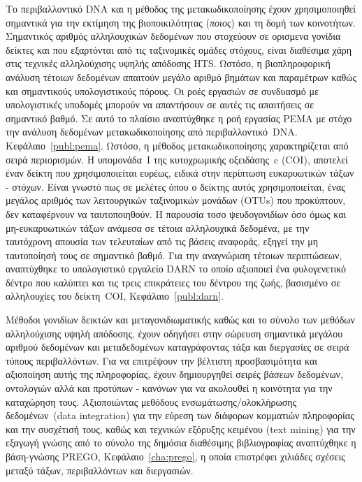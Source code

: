 \documentclass[master=elt, cleveref, autoref, masteroption=eg]{kulemt}
\begin{document}
\begin{abstract*}
   Το περιβαλλοντικό  \foreignlanguage{english}{DNA}  και η μέθοδος της μετακωδικοποίησης έχουν χρησιμοποιηθεί σημαντικά για την εκτίμηση της βιοποικιλότητας
   (\textit{ποιος}) και τη δομή των κοινοτήτων. 
   Σημαντικός αριθμός αλληλουχικών δεδομένων που στοχεύουν σε ορισμενα γονίδια δείκτες και που εξαρτόνται από τις ταξινομικές ομάδες στόχους, 
   είναι διαθέσιμα χάρη στις τεχνικές αλληλούχισης υψηλής απόδοσης \foreignlanguage{english}{HTS}. 
   Ωστόσο, η βιοπληροφορική ανάλυση τέτοιων δεδομένων απαιτούν μεγάλο αριθμό βημάτων και παραμέτρων καθώς και σημαντικούς υπολογιστικούς πόρους. 
   Οι ροές εργασιών σε συνδυασμό με υπολογιστικές υποδομές μπορούν να απαντήσουν σε αυτές τις απαιτήσεις σε σημαντικό βαθμό. 
   Σε αυτό το πλαίσιο αναπτύχθηκε η ροή εργασίας \foreignlanguage{english}{PEMA} με στόχο την ανάλυση δεδομένων μετακωδικοποίησης από περιβαλλοντικό~\foreignlanguage{english}{DNA}.
   Κεφάλαιο~\foreignlanguage{english}{\ref{publ:pema}}.
   Ωστόσο, η μέθοδος μετακωδικοποίησης χαρακτηρίζεται από σειρά περιορισμών. 
   Η υπομονάδα~\foreignlanguage{english}{I} της κυτοχρωμικής οξειδάσης~\foreignlanguage{english}{c (COI)}, αποτελεί έναν δείκτη 
   που χρησιμοποιείται ευρέως, ειδικά στην περίπτωση ευκαρυωτικών τάξων - στόχων. 
   Είναι γνωστό πως σε μελέτες όπου ο δείκτης αυτός χρησιμοποιείται, ένας μεγάλος αριθμός των λειτουργικών 
   ταξινομικών μονάδων \foreignlanguage{english}{(OTUs)} που προκύπτουν, δεν καταφέρνουν να ταυτοποιηθούν. 
   Η παρουσία τοσο ψευδογονιδίων όσο όμως και μη-ευκαρυωτικών τάξων ανάμεσα σε τέτοια αλληλουχικά δεδομένα,
   με την ταυτόχρονη απουσία των τελευταίων από τις βάσεις αναφοράς, εξηγεί την μη ταυτοποίησή τους σε σημαντικό βαθμό. 
   Για την αναγνώριση τέτοιων περιπτώσεων, αναπτύχθηκε το υπολογιστικό εργαλείο \foreignlanguage{english}{DARN} το οποίο 
   αξιοποιεί ένα φυλογενετικό δέντρο που καλύπτει και τις τρεις επικράτειες του δέντρου της ζωής, βασισμένο σε αλληλουχίες του 
   δείκτη~\foreignlanguage{english}{COI}, Κεφάλαιο~\foreignlanguage{english}{\ref{publ:darn}}.

   Μέθοδοι γονιδίων δεικτών και μεταγονιδιωματικής καθώς και το σύνολο των μεθόδων αλληλούχισης υψηλή απόδοσης, 
   έχουν οδηγήσει στην σώρευση σημαντικά μεγάλου αριθμού δεδομένων και μεταδεδομένων 
   καταγράφοντας τάξα και διεργασίες σε σειρά τύπους περιβαλλόντων.
   Για να επιτρέψουν την βέλτιστη προσβασιμότητα και αξιοποίηση αυτής της πληροφορίας,
   έχουν δημιουργηθεί
   σειρές βάσεων δεδομένων, οντολογιών αλλά και προτύπων - κανόνων για να ακολουθεί η κοινότητα 
   για την καταχώρηση τους.
   Αξιοποιώντας μεθόδους ενσωμάτωσης/ολοκλήρωσης δεδομένων~(\foreignlanguage{english}{data integration}) για 
   την εύρεση των διάφορων κομματιών πληροφορίας και την συσχέτισή τους, καθώς και τεχνικών εξόρυξης κειμένου
   (\foreignlanguage{english}{text mining}) για την εξαγωγή γνώσης από το σύνολο της δημόσια διαθέσιμης βιβλιογραφίας
   αναπτύχθηκε η βάση-γνώσης \foreignlanguage{english}{PREGO}, Κεφάλαιο~\foreignlanguage{english}{\ref{cha:prego}},
   η οποία επιστρέφει χιλιάδες σχέσεις μεταξύ τάξων, περιβαλλόντων και διεργασιών. 



\end{abstract*}
\end{document}
